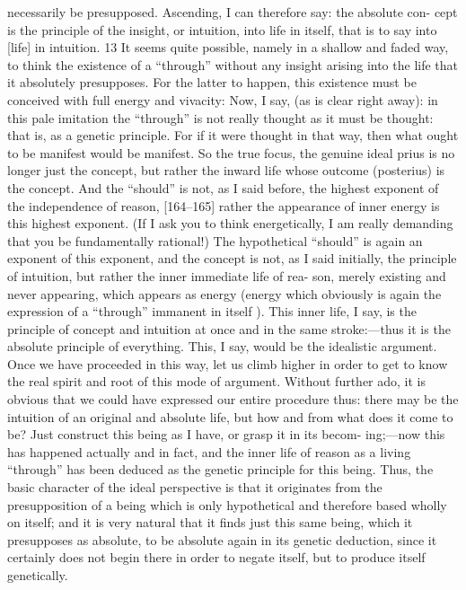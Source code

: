 necessarily be presupposed.
 Ascending, I can therefore say: the absolute con-
cept is the principle of the insight, or intuition, into life in itself, that is to say
into [life] in intuition.
 13 It seems quite possible, namely in a shallow and faded
way, to think the existence of a “through” without any insight arising into the
life that it absolutely presupposes.
 For the latter to happen, this existence must
be conceived with full energy and vivacity: Now, I say, (as is clear right away):
in this pale imitation the “through” is not really thought as it must be thought:
that is, as a genetic principle.
 For if it were thought in that way, then what
ought to be manifest would be manifest.
 So the true focus, the genuine ideal
prius is no longer just the concept, but rather the inward life whose outcome
(posterius) is the concept.
 And the “should” is not, as I said before, the highest
exponent of the independence of reason, [164–165] rather the appearance of
inner energy is this highest exponent.
 (If I ask you to think energetically, I am
really demanding that you be fundamentally rational!) The hypothetical
“should” is again an exponent of this exponent, and the concept is not, as I said
initially, the principle of intuition, but rather the inner immediate life of rea-
son, merely existing and never appearing, which appears as energy (energy
which obviously is again the expression of a “through” immanent in itself ).
This inner life, I say, is the principle of concept and intuition at once and in
the same stroke:—thus it is the absolute principle of everything.
 This, I say,
would be the idealistic argument.
Once we have proceeded in this way, let us climb higher in order to get
to know the real spirit and root of this mode of argument.
 Without further
ado, it is obvious that we could have expressed our entire procedure thus: there
may be the intuition of an original and absolute life, but how and from what
does it come to be? Just construct this being as I have, or grasp it in its becom-
ing;—now this has happened actually and in fact, and the inner life of reason
as a living “through” has been deduced as the genetic principle for this being.
Thus, the basic character of the ideal perspective is that it originates from the
presupposition of a being which is only hypothetical and therefore based
wholly on itself; and it is very natural that it finds just this same being, which
it presupposes as absolute, to be absolute again in its genetic deduction, since
it certainly does not begin there in order to negate itself, but to produce itself
genetically.
